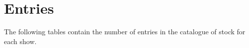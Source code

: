 \appendix
\chapter*{Entries}
The following tables contain the number of entries in the catalogue of stock for each show.
\addtolength{\textwidth}{-3cm}
\addtolength{\oddsidemargin}{1.5cm}




%
%

